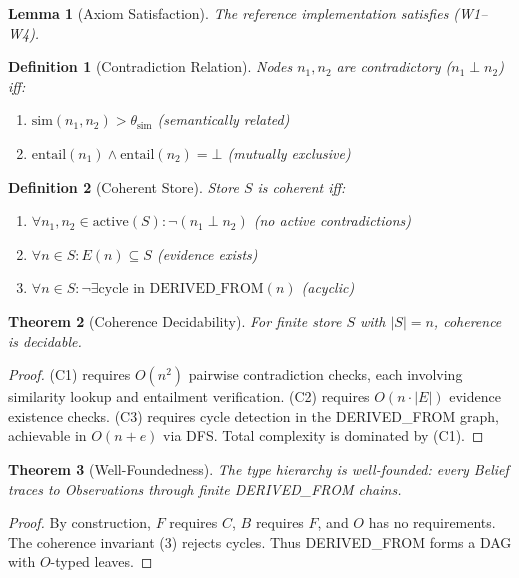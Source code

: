 \documentclass[11pt,letterpaper]{article}
\newtheorem{definition}{Definition}[section]
\newtheorem{theorem}{Theorem}[section]
\newtheorem{lemma}[theorem]{Lemma}
\begin{document}
\begin{lemma}[Axiom Satisfaction]
\label{lem:monotone}
The reference implementation satisfies (W1--W4).
\end{lemma}

\begin{definition}[Contradiction Relation]
\label{def:contradiction}
Nodes $n_1, n_2$ are contradictory ($n_1 \perp n_2$) iff:
\begin{enumerate}[noitemsep]
    \item $\text{sim}(n_1, n_2) > \theta_{\text{sim}}$ (semantically related)
    \item $\text{entail}(n_1) \wedge \text{entail}(n_2) = \bot$ (mutually exclusive)
\end{enumerate}
\end{definition}

\begin{definition}[Coherent Store]
\label{def:coherent}
Store $S$ is coherent iff:
\begin{enumerate}[noitemsep]
    \item $\forall n_1, n_2 \in \text{active}(S): \neg(n_1 \perp n_2)$ (no active contradictions)
    \item $\forall n \in S: E(n) \subseteq S$ (evidence exists)
    \item $\forall n \in S: \neg\exists \text{cycle in DERIVED\_FROM}(n)$ (acyclic)
\end{enumerate}
\end{definition}

\begin{theorem}[Coherence Decidability]
\label{thm:coherence}
For finite store $S$ with $|S| = n$, coherence is decidable.
\end{theorem}

\begin{proof}
(C1) requires $O(n^2)$ pairwise contradiction checks, each involving similarity lookup and entailment verification. (C2) requires $O(n \cdot |E|)$ evidence existence checks. (C3) requires cycle detection in the DERIVED\_FROM graph, achievable in $O(n + e)$ via DFS. Total complexity is dominated by (C1).
\end{proof}

\begin{theorem}[Well-Foundedness]
\label{thm:wellfounded}
The type hierarchy is well-founded: every Belief traces to Observations through finite DERIVED\_FROM chains.
\end{theorem}

\begin{proof}
By construction, $F$ requires $C$, $B$ requires $F$, and $O$ has no requirements. The coherence invariant (3) rejects cycles. Thus DERIVED\_FROM forms a DAG with $O$-typed leaves.
\end{proof}
\end{document}
